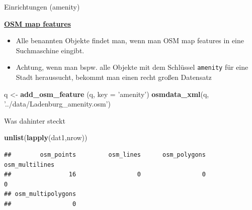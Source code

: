 \documentclass[ignorenonframetext,]{beamer}
\newenvironment{Shaded}{\begin{snugshade}}{\end{snugshade}}
\newcommand{\DataTypeTok}[1]{\textcolor[rgb]{0.13,0.29,0.53}{#1}}
\newcommand{\KeywordTok}[1]{\textcolor[rgb]{0.13,0.29,0.53}{\textbf{#1}}}
\newcommand{\NormalTok}[1]{#1}
\newcommand{\OperatorTok}[1]{\textcolor[rgb]{0.81,0.36,0.00}{\textbf{#1}}}
\newcommand{\StringTok}[1]{\textcolor[rgb]{0.31,0.60,0.02}{#1}}
\begin{document}
\begin{frame}[fragile]{Einrichtungen (amenity)}
\protect\hypertarget{einrichtungen-amenity}{}

\begin{block}{\href{https://wiki.openstreetmap.org/wiki/Map_Features}{\textbf{OSM
map features}}}

\begin{itemize}
\item
  Alle benannten Objekte findet man, wenn man OSM map features in eine
  Suchmaschine eingibt.
\item
  Achtung, wenn man bspw. alle Objekte mit dem Schlüssel
  \texttt{amenity} für eine Stadt heraussucht, bekommt man einen recht
  großen Datensatz
\end{itemize}

\begin{Shaded}
\begin{Highlighting}[]
\NormalTok{q <-}\StringTok{ }\KeywordTok{add_osm_feature}\NormalTok{ (q, }\DataTypeTok{key =} \StringTok{'amenity'}\NormalTok{)}
\KeywordTok{osmdata_xml}\NormalTok{(q, }\StringTok{'../data/Ladenburg_amenity.osm'}\NormalTok{)}
\end{Highlighting}
\end{Shaded}

\end{block}

\end{frame}

\begin{frame}[fragile]{Was dahinter steckt}
\protect\hypertarget{was-dahinter-steckt}{}

\begin{Shaded}
\end{Shaded}

\begin{Shaded}
\begin{Highlighting}[]
\KeywordTok{unlist}\NormalTok{(}\KeywordTok{lapply}\NormalTok{(dat1,nrow))}
\end{Highlighting}
\end{Shaded}

\begin{verbatim}
##        osm_points         osm_lines      osm_polygons    osm_multilines 
##                16                 0                 0                 0 
## osm_multipolygons 
##                 0
\end{verbatim}

\end{frame}
\end{document}

